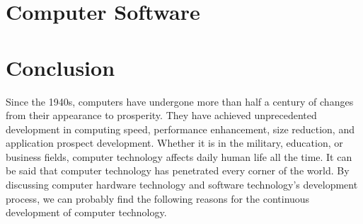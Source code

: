 \documentclass{article}
\begin{document}
\section{Computer Software}

\section{Conclusion}
Since the 1940s, computers have undergone more than half a century of changes from their appearance to prosperity. They have achieved unprecedented development in computing speed, performance enhancement, size reduction, and application prospect development. Whether it is in the military, education, or business fields, computer technology affects daily human life all the time. It can be said that computer technology has penetrated every corner of the world. By discussing computer hardware technology and software technology's development process, we can probably find the following reasons for the continuous development of computer technology.
\end{document}
